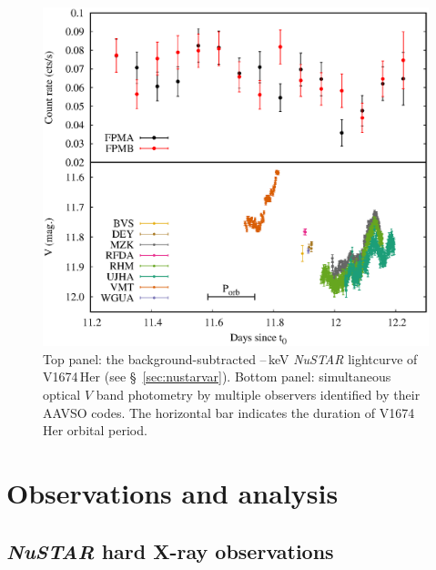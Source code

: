 \documentclass[a4paper,fleqn,usenatbib]{mnras}
\newcommand{\nova}{V1674\,Her}
\begin{document}
\begin{figure}
        \includegraphics[width=1.0\linewidth,clip=true,trim=0cm 5.5cm 0cm 0cm,angle=0]{lightcurve_optObsNuSTAR.eps}
    \caption{Top panel: the background-subtracted \nustarenergylow{}--\nustarenergyhigh{}\,keV {\em NuSTAR} lightcurve of \nova{}
(see \S~\ref{sec:nustarvar}).
Bottom panel: simultaneous optical $V$ band photometry by multiple 
observers identified by their AAVSO codes. 
The horizontal bar indicates the duration of \nova{} orbital period.}
    \label{fig:nustarlc}
\end{figure}


\section{Observations and analysis}
\label{sec:obs}


\subsection{{\em NuSTAR} hard X-ray observations}
\label{sec:nustarobs}
\end{document}

